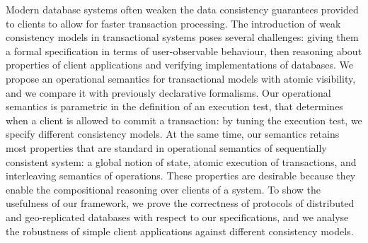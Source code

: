Modern database systems often weaken the data consistency guarantees 
provided to clients to allow for faster transaction processing. 
The introduction of weak consistency models in transactional systems 
poses several challenges: giving them a formal specification in terms 
of user-observable behaviour, then reasoning about properties of client applications 
and verifying implementations of databases.
We propose an operational semantics for transactional models with  
atomic visibility, and we compare it with previously declarative formalisms. 
Our operational semantics is parametric in the definition of an execution test, 
that determines when a client is allowed to commit a transaction: 
by tuning the execution test, 
we specify different consistency models. 
At the same time, our semantics retains most properties 
that are standard in operational semantics of sequentially consistent system: 
a global notion of state, atomic execution of transactions, and interleaving 
semantics of operations. These properties are desirable because they enable 
the compositional reasoning over clients of a system.
To show the usefulness of our framework, we prove the correctness 
of protocols of distributed and geo-replicated databases with respect 
to our specifications, and we analyse the robustness of simple client applications 
against different consistency models.



